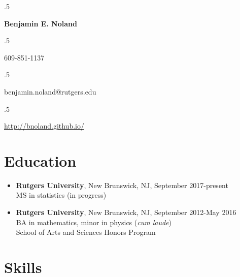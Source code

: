 \documentclass[12pt]{article}
\begin{document}
\moveleft.5\hoffset\centerline{\Large\bf Benjamin E. Noland}
\smallskip
\moveleft.5\hoffset\centerline{609-851-1137}
\moveleft.5\hoffset\centerline{benjamin.noland@rutgers.edu}
\moveleft.5\hoffset\centerline{\url{http://bnoland.github.io/}}

\section*{Education}

\begin{itemize}
\item
\textbf{Rutgers University}, New Brunswick, NJ, September 2017-present \\
MS in statistics (in progress)

\item
\textbf{Rutgers University}, New Brunswick, NJ, September 2012-May 2016 \\
BA in mathematics, minor in physics (\textit{cum laude}) \\
School of Arts and Sciences Honors Program
\end{itemize}
\iffalse
\subsection*{Selection of coursework:}
\begin{itemize}
\item
\textbf{Mathematics:} Calculus, linear algebra, ordinary differential equations, real analysis, 
complex variables, differential geometry, linear programming, abstract algebra, topology 
\textit{(taken at Rutgers University)}

\item
\textbf{Physics:}
Classical mechanics, electromagnetism, astrophysics \textit{(taken at Rutgers University)}

\item
\textbf{Computer science:}
Systems programming, data structures and algorithms \textit{(taken at Princeton University while in 
high school)}; Advanced Placement computer science \textit{(taken in high school)}

\item
\textbf{Statistics:} Advanced Placement statistics \textit{(taken in high school)}, probability 
theory, regression analysis \textit{(taking at Rutgers University)}

\end{itemize}
\fi
\section*{Skills}
\end{document}
